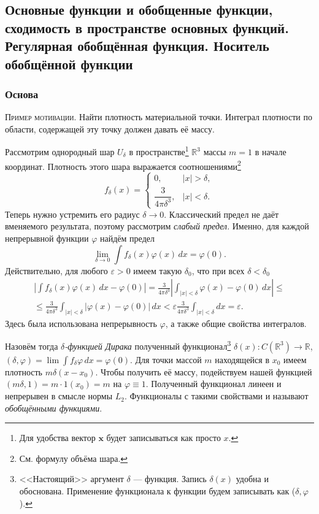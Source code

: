 \subsection{Основные функции и обобщенные функции, сходимость в пространстве основных функций. Регулярная обобщённая функция. Носитель обобщённой функции}
\subsubsection{Основа}
\textsc{Пример мотивации.} Найти плотность материальной точки. Интеграл
плотности по
области, содержащей эту точку должен давать её массу.

Рассмотрим однородный шар $ U_\delta $ в пространстве\footnote{Для удобства
вектор $ \mathbf x $ будет записываться как просто $ x $.} $ \mathbb R^3 $ массы $ m = 1 $ в начале координат. Плотность этого шара выражается
соотношениями\footnote{См. формулу объёма шара.}  
\[
  f_\delta(x) = \begin{cases}
    0, & |x| > \delta,\\
    \dfrac{3}{4\pi \delta^3}, & |x| < \delta.
  \end{cases}
\]
Теперь нужно устремить его радиус $ \delta \to 0 $. Классический предел не
даёт вменяемого результата, поэтому рассмотрим \emph{слабый предел}. Именно, для
каждой непрерывной функции $ \varphi $ найдём предел 
\[
  \lim_{\delta \to 0} \int f_\delta(x)\varphi(x) \, dx = \varphi(0).
\]
Действительно, для любого $ \varepsilon > 0 $ имеем такую $ \delta_0 $, что при
всех $ \delta < \delta_0 $ 
\begin{multline*}
    \left| \int f_\delta(x)\varphi(x)\, dx - \varphi(0) \right| =
    \frac{3}{4\pi\delta^3} \left| \int_{|x| < \delta} \varphi(x) - \varphi(0)\,dx
    \right| \leqslant\\\leqslant
    \frac{3}{4\pi\delta^3} \int_{|x|<\delta}|\varphi(x)-\varphi(0)|\, dx <
    \varepsilon \frac{3}{4\pi\delta^3} \int_{|x| <\delta} dx = \varepsilon.
\end{multline*}
Здесь была использована непрерывность $ \varphi $, а также общие свойства
интегралов.

\sloppy
Назовём тогда \emph{$ \delta $-функцией Дирака} полученный
функционал\footnote{<<Настоящий>> аргумент $ \delta $ --- функция. Запись $
\delta(x) $ удобна и обоснована. Применение функционала к функции будем записывать как ($\delta,
\varphi  $).} $ \delta(x)\colon C(\mathbb R^3) \to \mathbb R $, $(\delta, \varphi) = \lim\int
f_\delta\varphi\,dx = \varphi(0)$. Для точки массой $ m $ находящейся в
$ x_0  $ имеем плотность $
m\delta(x - x_0) $. Чтобы получить её массу, подействуем нашей функцией $ (m\delta, 1)
= m\cdot1(x_0) = m$ на $ \varphi\equiv 1 $. Полученный функционал линеен и
непрерывен в смысле нормы $ L_2 $. Функционалы с такими свойствами и называют
\emph{обобщёнными функциями}.

